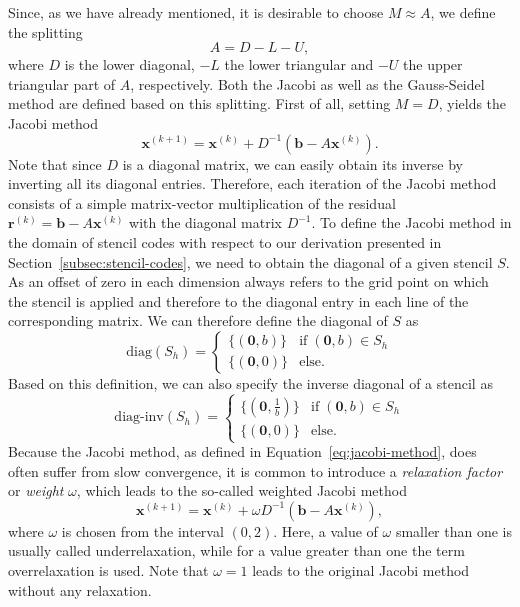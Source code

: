 Since, as we have already mentioned, it is desirable to choose $M \approx A$, we define the splitting
\begin{equation}
	A = D - L - U,
\end{equation} 
where $D$ is the lower diagonal, $-L$ the lower triangular and $-U$ the upper triangular part of $A$, respectively.
Both the Jacobi as well as the Gauss-Seidel method are defined based on this splitting.
First of all, setting $M = D$, yields the Jacobi method
\begin{equation}
	\bm{x}^{(k+1)} = \bm{x}^{(k)} + D^{-1}(\bm b - A \bm{x}^{(k)}).
	\label{eq:jacobi-method}
\end{equation}
Note that since $D$ is a diagonal matrix, we can easily obtain its inverse by inverting all its diagonal entries.
Therefore, each iteration of the Jacobi method consists of a simple matrix-vector multiplication of the residual $\bm{r}^{(k)} = \bm{b} - A \bm{x}^{(k)}$ with the diagonal matrix $D^{-1}$.
To define the Jacobi method in the domain of stencil codes with respect to our derivation presented in Section~\ref{subsec:stencil-codes}, we need to obtain the diagonal of a given stencil $S$.
As an offset of zero in each dimension always refers to the grid point on which the stencil is applied and therefore to the diagonal entry in each line of the corresponding matrix.
We can therefore define the diagonal of $S$ as
\begin{equation}
	\text{diag}(S_h) = \begin{cases}
		\{(\bm{0}, b) \} & \text{if} \; (\bm 0, b) \in S_h \\
		\{(\bm{0}, 0) \} & \text{else}.
	\end{cases}
	\label{eq:stencil-diag}
\end{equation}
Based on this definition, we can also specify the inverse diagonal of a stencil as
\begin{equation}
	\text{diag-inv}(S_h) = \begin{cases}
		\{(\bm{0}, \frac{1}{b}) \} & \text{if} \; (\bm 0, b) \in S_h \\
		\{(\bm{0}, 0) \} & \text{else}.
	\end{cases}
	\label{eq:stencil-diag-inv}
\end{equation}
Because the Jacobi method, as defined in Equation~\eqref{eq:jacobi-method}, does often suffer from slow convergence, it is common to introduce a \emph{relaxation factor} or \emph{weight} $\omega$, which leads to the so-called weighted Jacobi method
\begin{equation}
	\bm{x}^{(k+1)} = \bm{x}^{(k)} + \omega D^{-1}(\bm b - A \bm{x}^{(k)}),
	\label{eq:weighted-jacobi-method}
\end{equation}
where $\omega$ is chosen from the interval $\left(0, 2\right)$.
Here, a value of $\omega$ smaller than one is usually called underrelaxation, while for a value greater than one the term overrelaxation is used.
Note that $\omega = 1$ leads to the original Jacobi method without any relaxation.

